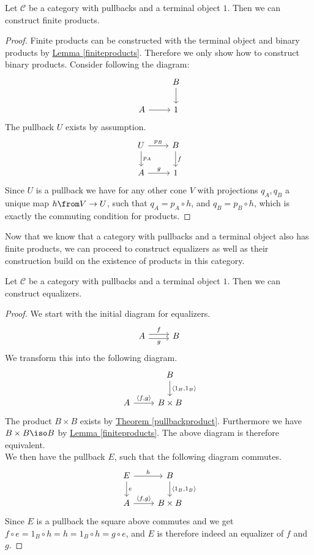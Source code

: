 \begin{fact}
  \label{pullbackproduct}
  Let $\mathscr C$ be a category with pullbacks and a terminal object $1$.
  Then we can construct finite products.
\end{fact}
\begin{proof}
Finite products can be constructed
with the terminal object and binary products by
\hyperref[finiteproducts]{Lemma \ref*{finiteproducts}}.
Therefore we only show how to construct binary products.
Consider following the diagram:
\[
  \begin{tikzcd}
    & B \arrow{d} \\
    A \arrow{r} & 1
  \end{tikzcd}
\]
The pullback $U$ exists by assumption.
\[
  \begin{tikzcd}
    U \arrow{r}{p_B} \arrow{d}{p_A} & B \arrow{d}{f} \\
    A \arrow{r}{g} & 1
  \end{tikzcd}
\]
Since $U$ is a pullback we have for any other cone $V$ with projections $q_A, q_B$
a unique map $h \from V \to U$, such that
$q_A = p_A \circ h$, and $q_B = p_B \circ h$, which is exactly the commuting condition
for products.
\end{proof}

Now that we know that a category with pullbacks and a terminal object
also has finite products, we can proceed to construct equalizers as well
as their construction build on the existence of products in this category.

\begin{theorem}
  \label{pullbackequalizer}
  Let $\mathscr C$ be a category with pullbacks and a terminal object $1$.
  Then we can construct equalizers.
\end{theorem}
\begin{proof}
  We start with the initial diagram for equalizers.
  \[
    \begin{tikzcd}
      A \arrow[shift left]{r}{f} \arrow[shift right, swap]{r}{g} & B
    \end{tikzcd}
  \]
  We transform this into the following diagram.
  \[
    \begin{tikzcd}
      & B \arrow{d}{\langle 1_B, 1_B \rangle} \\
      A \arrow{r}{\langle f,g \rangle} & B \times B
    \end{tikzcd}
  \]
  The product $B \times B$ exists by \hyperref[pullbackproduct]{Theorem \ref*{pullbackproduct}}.
  Furthermore we have $B \times B \iso B$ by \hyperref[finiteproducts]{Lemma \ref*{finiteproducts}}.
  The above diagram is therefore equivalent.\\
  We then have the pullback $E$, such that the following diagram commutes.
  \[
    \begin{tikzcd}
      E \arrow{r}{h} \arrow{d}{e} & B \arrow{d}{\langle 1_B, 1_B \rangle} \\
      A \arrow{r}{\langle f,g \rangle} & B \times B
    \end{tikzcd}
  \]
  Since $E$ is a pullback the square above commutes and
  we get $f \circ e = 1_B \circ h = h = 1_B \circ h = g \circ e$, and $E$ is therefore
  indeed an equalizer of $f$ and $g$.
\end{proof}

